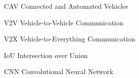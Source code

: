\begin{abbreviations}
\item[CAV] Connected and Automated Vehicles
\item[V2V] Vehicle-to-Vehicle Communication
\item[V2X] Vehicle-to-Everything Communication
\item[IoU] Intersection over Union
\item[CNN] Convolutional Neural Network
\end{abbreviations}

